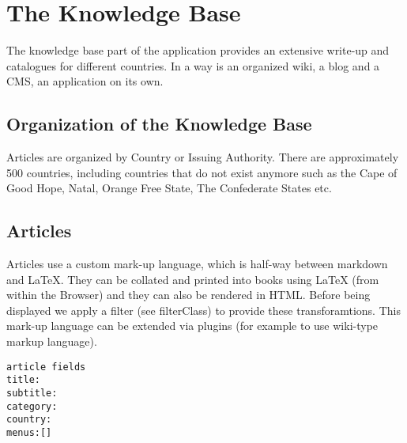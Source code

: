\chapter{The Knowledge Base}

The knowledge base part of the application provides an extensive write-up and catalogues for
different countries. In a way is an organized wiki, a blog and a CMS, an application on its own.

\section{Organization of the Knowledge Base}

Articles are organized by Country or Issuing Authority. There are approximately 500 countries, including countries that do not exist anymore such as the Cape of Good Hope, Natal, Orange Free State, The Confederate States etc.

\section{Articles}

Articles use a custom mark-up language, which is half-way between markdown and LaTeX. They can be collated and printed into books using LaTeX (from within the Browser) and they can also be rendered in HTML. Before being displayed we apply a filter (see filterClass)  to provide these transforamtions. This mark-up language can be extended via plugins (for example to use wiki-type markup language).

\begin{verbatim}
article fields
title:
subtitle:
category:
country:
menus:[]
\end{verbatim}






